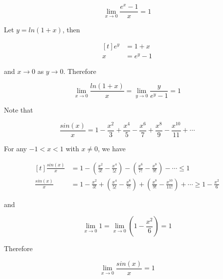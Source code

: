\documentclass[a4paper,12pt]{article}
\begin{document}
\begin{thm}
  $$\lim_{x\to 0}\frac{e^{x}-1}{x}=1$$\s

   Let $y=ln(1+x)$, then

  $$\begin{aligned}[t]
    e^{y}&=1+x\\
    x&=e^{y}-1
  \end{aligned}$$\s

  and $x\to 0$ as $y\to 0$. Therefore

  $$\lim_{x\to 0}\frac{ln(1+x)}{x}=\lim_{y\to 0}\frac{y}{e^{y}-1}=1$$\s

   Note that

  $$\frac{sin(x)}{x}=1-\frac{x^{2}}{3}+\frac{x^{4}}{5}-\frac{x^{6}}{7}+\frac{x^{8}}{9}-\frac{x^{10}}{11}+\cdots$$\s

  For any $-1<x<1$ with $x\neq 0$, we have

  $$\begin{aligned}[t]
    \frac{sin(x)}{x}&=1-(\frac{x^{2}}{3!}-\frac{x^{4}}{5!})-(\frac{x^{6}}{7!}-\frac{x^{8}}{9!})-\cdots \leq 1\\
    \frac{sin(x)}{x}&=1-\frac{x^{2}}{3!}+(\frac{x^{4}}{5!}-\frac{x^{6}}{7!})+(\frac{x^{8}}{9!}-\frac{x^{10}}{11!})+\cdots \geq 1-\frac{x^{2}}{6}
  \end{aligned}$$\s

  and

  $$\lim_{x\to 0}1=\lim_{x\to 0}(1-\frac{x^{2}}{6})=1$$

  Therefore

  $$\lim_{x\to 0}\frac{sin(x)}{x}=1$$
\end{thm}
\end{document}
